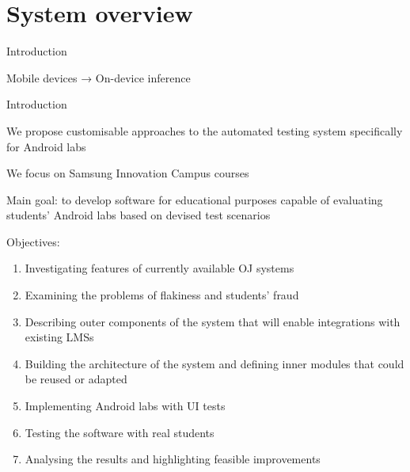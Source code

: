 \documentclass{beamer}%
\begin{document}
\section[System overview]{System overview}
\begin{frame}{Introduction}

Mobile devices → { On-device inference }






\end{frame}
\begin{frame}{Introduction}
\footnotesize

We propose customisable approaches to the automated testing system specifically for Android labs

We focus on Samsung Innovation Campus courses

{ Main goal}: to develop software for educational purposes capable of evaluating students' Android labs based on devised test scenarios


Objectives:
\begin{enumerate}
\item Investigating features of currently available OJ systems
\item Examining the problems of flakiness and students' fraud
\item Describing outer components of the system that will enable integrations with existing LMSs
\item Building the architecture of the system and defining inner modules that could be reused or adapted
\item Implementing Android labs with UI tests
\item Testing the software with real students
\item Analysing the results and highlighting feasible improvements
\end{enumerate}



\end{frame}
\end{document}

